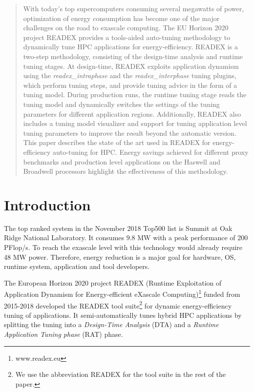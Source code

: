 \documentclass[runningheads]{llncs}
\begin{document}
\begin{abstract}
With today's top supercomputers consuming several mega\-watts of power, optimization of energy consumption has become one of the major challenges on the road to exascale computing.
The EU Horizon 2020 project READEX provides a tools-aided auto-tuning methodology to dynamically tune HPC applications for energy-efficiency. READEX is a two-step methodology, consisting of the design-time analysis and runtime tuning stages. At design-time, READEX exploits application dynamism using the \textit{readex\_intraphase} and the \textit{readex\_interphase} tuning plugins, which perform tuning steps, and provide tuning advice in the form of a tuning model. During production runs, the runtime tuning stage reads the tuning model and dynamically switches the settings of the tuning parameters for different application regions. Additionally, READEX also includes a tuning model visualizer and support for tuning application level tuning parameters to improve the result beyond the automatic version. This paper describes the state of the art used in READEX for energy-efficiency auto-tuning for HPC. Energy savings achieved for different proxy benchmarks and production level applications on the Haswell and Broadwell processors highlight the effectiveness of this methodology.

\end{abstract}

\section{Introduction} \label{sec:introduction}

The top ranked system in the November 2018 Top500 list is Summit at Oak Ridge National Laboratory. It consumes 9.8 MW with a peak performance of 200 PFlop/s. To reach the exascale level with this technology would already require 48 MW power. Therefore, energy reduction is a major goal for hardware, OS, runtime system, application and tool developers. 

The European Horizon 2020 project READEX (Runtime Exploitation of Application Dynamism for Energy-efficient eXascale Computing)\footnote{www.readex.eu} funded from 2015-2018 developed the READEX tool suite\footnote{We use the abbreviation READEX for the tool suite in the rest of the paper.} for dynamic energy-efficiency tuning of applications. It semi-automatically tunes hybrid HPC applications by splitting the tuning into a \textit{Design-Time Analysis} (DTA) and a \textit{Runtime Application Tuning phase} (RAT) phase. 
\end{document}

